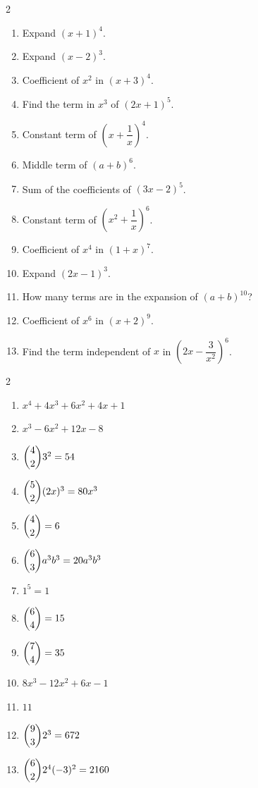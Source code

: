 \documentclass[11pt]{article}
\begin{document}
\begin{recapbox}
\begin{multicols}{2}
\small
\begin{enumerate}[leftmargin=*,itemsep=3pt]
  \item Expand $(x+1)^4$.
  \item Expand $(x-2)^3$.
  \item Coefficient of $x^2$ in $(x+3)^4$.
  \item Find the term in $x^3$ of $(2x+1)^5$.
  \item Constant term of $\left(x+\dfrac1x\right)^4$.
  \item Middle term of $(a+b)^6$.
  \item Sum of the coefficients of $(3x-2)^5$.
  \item Constant term of $\left(x^2+\dfrac1x\right)^6$.
  \item Coefficient of $x^4$ in $(1+x)^7$.
  \item Expand $(2x-1)^3$.
  \item How many terms are in the expansion of $(a+b)^{10}$?
  \item Coefficient of $x^6$ in $(x+2)^9$.
  \item Find the term independent of $x$ in $\left(2x-\dfrac{3}{x^2}\right)^6$.
\end{enumerate}
\end{multicols}
\end{recapbox}

\begin{keybox}
\begin{multicols}{2}
\small
\begin{enumerate}[leftmargin=*,itemsep=3pt]
  \item $x^4+4x^3+6x^2+4x+1$
  \item $x^3-6x^2+12x-8$
  \item $\dbinom{4}{2}3^2=54$
  \item $\dbinom{5}{2}(2x)^3=80x^3$
  \item $\dbinom{4}{2}=6$
  \item $\dbinom{6}{3}a^3b^3=20a^3b^3$
  \item $1^5=1$
  \item $\dbinom{6}{4}=15$
  \item $\dbinom{7}{4}=35$
  \item $8x^3-12x^2+6x-1$
  \item $11$
  \item $\dbinom{9}{3}2^3=672$
  \item $\dbinom{6}{2}2^4(-3)^2=2160$
\end{enumerate}
\end{multicols}
\end{keybox}
\end{document}
